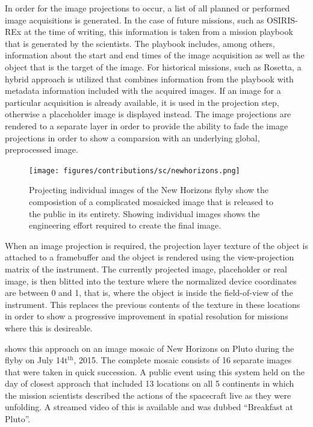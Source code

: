 In order for the image projections to occur, a list of all planned or performed image acquisitions is generated.  In the case of future missions, such as OSIRIS-REx at the time of writing, this information is taken from a mission playbook that is generated by the scientists.  The playbook includes, among others, information about the start and end times of the image acquisition as well as the object that is the target of the image.  For historical missions, such as Rosetta, a hybrid approach is utilized that combines information from the playbook with metadata information included with the acquired images.  If an image for a particular acquisition is already available, it is used in the projection step, otherwise a placeholder image is displayed instead.  The image projections are rendered to a separate layer in order to provide the ability to fade the image projections in order to show a comparsion with an underlying global, preprocessed image.

\begin{figure}
\centering
\texttt{[image: figures/contributions/sc/newhorizons.png]}
\caption{Projecting individual images of the New Horizons flyby show the composistion of a complicated mosaicked image that is released to the public in its entirety.  Showing individual images shows the engineering effort required to create the final image.}
\label{contributions:astro:sc:newhorizons}
\end{figure}

When an image projection is required, the projection layer texture of the object is attached to a framebuffer and the object is rendered using the view-projection matrix of the instrument.  The currently projected image, placeholder or real image, is then blitted into the texture where the normalized device coordinates are between 0 and 1, that is, where the object is inside the field-of-view of the instrument.  This replaces the previous contents of the texture in these locations in order to show a progressive improvement in spatial resolution for missions where this is desireable.

 shows this approach on an image mosaic of New Horizons on Pluto during the flyby on July 14t$^{\textrm{th}}$, 2015.  The complete mosaic consists of 16 separate images that were taken in quick succession.  A public event using this system held on the day of closest approach that included 13 locations on all 5 continents in which the mission scientists described the actions of the spacecraft live as they were unfolding.  A streamed video of this is available and was dubbed ``Breakfast at Pluto''.

